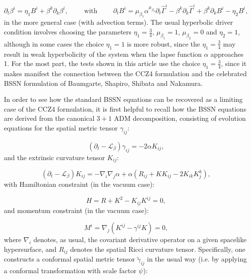 \documentclass{article}
\begin{document}
\begin{equation}
\partial_t \beta^i = \eta_1 B^i + \beta^k \partial_k \beta^i, \qquad \text{ with } \qquad \partial_t B^i = \mu_{\beta_1} \alpha^{\mu_{\beta_2}} \partial_t \hat{\Gamma}^i - \beta^k \partial_k \hat{\Gamma}^i + \beta^k \partial_k B^i - \eta_2 B^i,
\end{equation}
in the more general case (with advection terms). The usual hyperbolic driver condition involves choosing the parameters ${\eta_1 = \frac{3}{4}}$, ${\mu_{\beta_1} = 1}$, ${\mu_{\beta_2} = 0}$ and ${\eta_2 = 1}$, although in some cases the choice ${\eta_1 = 1}$ is more robust, since the ${\eta_1 = \frac{3}{4}}$ may result in weak hyperbolicity of the system when the lapse function ${\alpha}$ approaches 1. For the most part, the tests shown in this article use the choice ${\eta_1 = \frac{3}{4}}$, since it makes manifest the connection between the CCZ4 formulation and the celebrated BSSN formulation of Baumgarte, Shapiro, Shibata and Nakamura\cite{nakamura}.

In order to see how the standard BSSN equations can be recovered as a limiting case of the CCZ4 formulation, it is first helpful to recall how the BSSN equations are derived from the canonical ${3 + 1}$ ADM decomposition\cite{york}, consisting of evolution equations for the spatial metric tensor ${\gamma_{i j}}$:

\begin{equation}
\left( \partial_t - \mathcal{L}_{\beta} \right) \gamma_{i j} = -2 \alpha K_{i j},
\end{equation}
and the extrinsic curvature tensor ${K_{i j}}$:

\begin{equation}
\left( \partial_t - \mathcal{L}_{\beta} \right) K_{i j} = - \nabla_i \nabla_j \alpha + \alpha \left( R_{i j} + K K_{i j} - 2 K_{i k} K^{k}_{j} \right),
\end{equation}
with Hamiltonian constraint (in the vacuum case):

\begin{equation}
H = R + K^2 - K_{i j} K^{i j} = 0,
\end{equation}
and momentum constraint (in the vacuum case):

\begin{equation}
M^i = \nabla_j \left( K^{i j} - \gamma^{i j} K \right) = 0,
\end{equation}
where ${\nabla_i}$ denotes, as usual, the covariant derivative operator on a given spacelike hypersurface, and ${R_{i j}}$ denotes the spatial Ricci curvature tensor. Specifically, one constructs a conformal spatial metric tensor ${\tilde{\gamma}_{i j}}$ in the usual way (i.e. by applying a conformal transformation with scale factor ${\psi}$):
\end{document}
